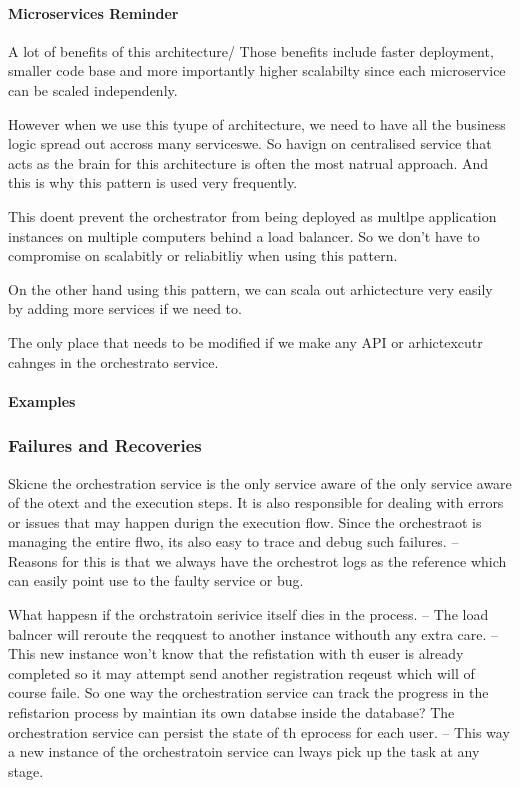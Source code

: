 \documentclass[a4paper, 11pt]{book}
\begin{document}
{    \paragraph{Microservices Reminder}
    A lot of benefits of this architecture/
    Those benefits include faster deployment, smaller code base and more importantly higher scalabilty since each microservice can be scaled independenly.

    However when we use this tyupe of architecture, we need to have all the business logic spread out accross many serviceswe.
    So havign on centralised service that acts as the brain for this architecture is often the most natrual approach.
    And this is why this pattern is used very frequently.

    This doent prevent the orchestrator from being deployed as multlpe application instances on multiple computers behind a load balancer.
    So we don't have to compromise on scalabitly or reliabitliy when using this pattern.

    On the other hand using this pattern, we can scala out arhictecture very easily by adding more services if we need to.

    The only place that needs to be modified if we make any API or arhictexcutr cahnges in the orchestrato service.

    \paragraph{Examples}

    \subsubsection{Failures and Recoveries}
    Skicne the orchestration service is the only service aware of the only service aware of the otext and the execution steps.
    It is also responsible for dealing with errors or issues that may happen durign the execution flow.
    Since the orchestraot is managing the entire flwo, its also easy to trace and debug such failures.
    -- Reasons for this is that we always have the orchestrot logs as the reference which can easily point use to the faulty service or bug.

    What happesn if the orchstratoin serivice itself dies in the process.
    -- The load balncer will reroute the reqquest to another instance withouth any extra care.
    -- This new instance won't know that the refistation with th euser is already completed so it may attempt send another registration reqeust which will of course faile.
    So one way the orchestration service can track the progress in the refistarion process by maintian its own databse inside the database?
    The orchestration service can persist the state of th eprocess for each user.
    -- This way a new instance of the orchestratoin service can lways pick up the task at any stage.

}
\end{document}
